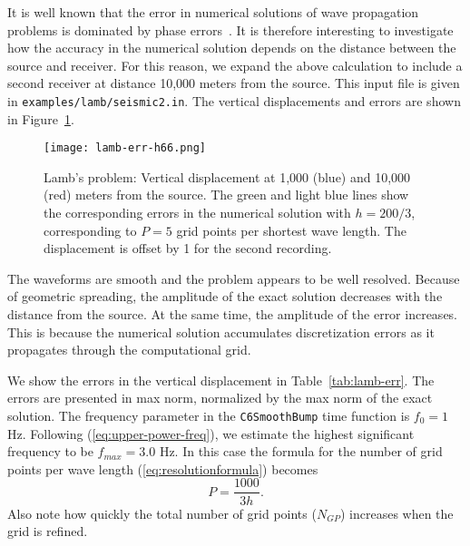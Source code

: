 \documentclass[11pt]{report}
\begin{document}
It is well known that the error in numerical solutions of wave propagation problems is dominated by
phase errors~\cite{Gustafsson-Kreiss-Oliger}. It is therefore interesting to investigate how the
accuracy in the numerical solution depends on the distance between the source and receiver. For this
reason, we expand the above calculation to include a second receiver at distance 10,000 meters from
the source. This input file is given in {\tt examples/lamb/seismic2.in}. The vertical displacements
and errors are shown in Figure~\ref{fig:lambSAC}.
\begin{figure}[ht]
  \begin{center}
    \texttt{[image: lamb-err-h66.png]}
    \caption{Lamb's problem: Vertical displacement at 1,000 (blue) and 10,000 (red) meters from the
      source. The green and light blue lines show the corresponding errors in the
      numerical solution with $h=200/3$, corresponding to $P=5$ grid points per shortest wave
      length. The displacement is offset by 1 for the second recording.}
    \label{fig:lambSAC}
  \end{center}
\end{figure}
The waveforms are smooth and the problem appears to be well resolved. Because of geometric
spreading, the amplitude of the exact solution decreases with the distance from the source. At the
same time, the amplitude of the error increases. This is because the numerical solution accumulates
discretization errors as it propagates through the computational grid.

We show the errors in the vertical displacement in Table~\ref{tab:lamb-err}. The errors are
presented in max norm, normalized by the max norm of the exact solution. The
frequency parameter in the {\tt C6SmoothBump} time function is $f_0=1$ Hz. Following
(\ref{eq:upper-power-freq}), we estimate the highest significant frequency to be $f_{max}=3.0$
Hz. In this case the formula for the number of grid points per wave length
(\ref{eq:resolutionformula}) becomes
\[
P=\frac{1000}{3 h}.
\]
Also note how quickly the total number of grid points ($N_{GP}$) increases when the grid is
refined. 
\end{document}
